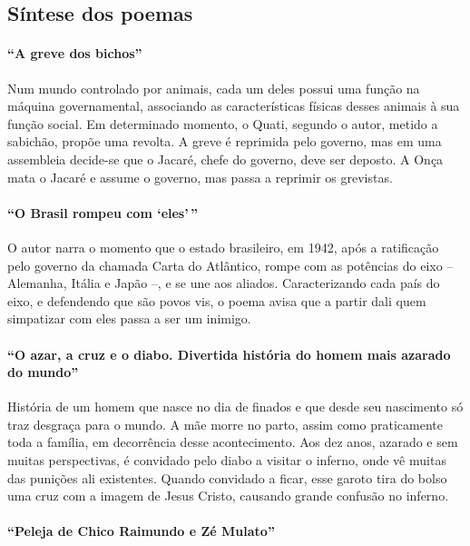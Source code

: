 \subsection{Síntese dos poemas}

\paragraph{``A greve dos bichos''}

Num mundo controlado por animais, cada um deles possui uma função na
máquina governamental, associando as características físicas desses
animais à sua função social. Em determinado momento, o Quati, segundo
o autor, metido a sabichão, propõe uma revolta. A greve é reprimida
pelo governo, mas em uma assembleia decide-se que o Jacaré,
chefe do governo, deve ser deposto. A Onça mata o Jacaré e assume o
governo, mas passa a reprimir os grevistas. 


\paragraph{``O Brasil rompeu com `eles'\,''}

O autor narra o momento que o estado brasileiro, em 1942, 
após a ratificação pelo governo da chamada Carta do Atlântico, 
rompe com as potências do eixo -- Alemanha, Itália e Japão --, e se une
aos aliados. Caracterizando cada país do eixo, e defendendo que são
povos vis, o poema avisa que a partir dali quem simpatizar com eles
passa a ser um inimigo.

\paragraph{``O azar, a cruz e o diabo. Divertida história do homem
mais azarado do mundo''}

História de um homem que nasce no dia de finados e que desde seu
nascimento só traz desgraça para o mundo. A mãe morre no parto, assim
como praticamente toda a família, em decorrência desse acontecimento.
Aos dez anos, azarado e sem muitas perspectivas, é convidado pelo diabo
a visitar o inferno, onde vê muitas das punições ali existentes. Quando
convidado a ficar, esse garoto tira do bolso uma cruz com a imagem de
Jesus Cristo, causando grande confusão no inferno.

\paragraph{``Peleja de Chico Raimundo e Zé Mulato''}

